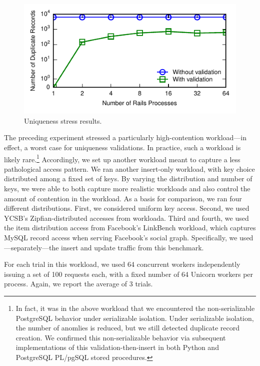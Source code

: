 \begin{figure}
\includegraphics[width=\columnwidth]{figs/pk_stress_violations.pdf}
\caption{Uniqueness stress results.}
\label{fig:pk-stress}
\end{figure} 

The preceding experiment stressed a particularly high-contention
workload---in effect, a worst case for uniqueness validations. In
practice, such a workload is likely rare.\footnote{In fact, it was in
  the above workload that we encountered the non-serializable
  PostgreSQL behavior under serializable isolation. Under serializable
  isolation, the number of anomlies is reduced, but we still detected
  duplicate record creation. We confirmed this non-serializable
  behavior via subsequent implementations of this
  validation-then-insert in both Python and PostgreSQL PL/pgSQL stored
  procedures.} Accordingly, we set up another workload meant to
capture a less pathological access pattern. We ran another insert-only
workload, with key choice distributed among a fixed set of keys. By
varying the distribution and number of keys, we were able to both
capture more realistic workloads and also control the amount of
contention in the workload. As a basis for comparison, we ran four
different distributions. First, we considered uniform key
access. Second, we used YCSB's Zipfian-distributed accesses from
workloada. Third and fourth, we used the item distribution access from
Facebook's LinkBench workload, which captures MySQL record access when
serving Facebook's social graph. Specifically, we
used---separately---the insert and update traffic from this
benchmark.

For each trial in this workload, we used 64 concurrent workers
independently issuing a set of 100 requests each, with a fixed number
of 64 Unicorn workers per process. Again, we report the average of 3
trials.

